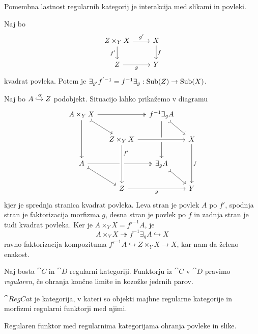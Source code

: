 \documentclass[../kategoricna_logika.tex]{subfiles}
\begin{document}
Pomembna lastnost regularnih kategorij je interakcija med
slikami in povleki.
\begin{lema}\label{lema:zamenjava-povleka-in-slike}
  Naj bo
  \begin{equation*}
    \begin{tikzcd}
      Z \times_Y X \ar[d, "f'"'] \ar[r, "g'"] & X \ar[d, "f"] \\
      Z \ar[r, "g"'] & Y
    \end{tikzcd}
  \end{equation*}
  kvadrat povleka. Potem je $\exists_{g'}f^{'-1} = f^{-1}\exists_g : \operatorname{Sub}(Z) \to \operatorname{Sub}(X)$.
\end{lema}
\begin{dokaz}
  Naj bo $A \xhookrightarrow{\alpha} Z$ podobjekt.  Situacijo lahko
  prikažemo v diagramu
  \begin{equation*}
    \begin{tikzcd}[column sep=small]
      A \times_Y X \ar[dd] \ar[dr, tail] \ar[rr, two heads] & &
      f^{-1}\exists_g A \ar[dd] \ar[dr, tail] & \\
      & Z \times_Y X  \ar[rr, crossing over] & & X \ar[dd, "f"] \\
      A \ar[dr, tail] \ar[rr, two heads] & & \exists_g A \ar[dr, tail] & \\
      & Z \ar[rr, "g"'] \ar[from=uu, pos=0.2, crossing over, "f'"] & &
      Y
    \end{tikzcd}
  \end{equation*}
  kjer je sprednja stranica kvadrat povleka.  Leva stran je povlek $A$
  po $f'$, spodnja stran je faktorizacija morfizma $g$, desna stran je
  povlek po $f$ in zadnja stran je tudi kvadrat povleka.  Ker je
  $A \times_Y X = f'^{-1}A$, je
  \[A \times_Y X \twoheadrightarrow f^{-1}\exists_g A \hookrightarrow
    X\] ravno faktorizacija kompozituma
  $f'^{-1}A \hookrightarrow Z \times_Y X \to X$, kar nam da želeno
  enakost.
\end{dokaz}
\begin{definicija}
  Naj bosta $\cat{C}$ in $\cat{D}$ regularni kategoriji.  Funktorju
  iz $\cat{C}$ v $\cat{D}$ pravimo \emph{regularen}, če ohranja
  končne limite in kozožke jedrnih parov.
\end{definicija}
\begin{definicija}
  $\cat{RegCat}$ je kategorija, v kateri so objekti majhne regularne
  kategorije in morfizmi regularni funktorji med njimi.
\end{definicija}
\begin{lema}
  Regularen funktor med regularnima kategorijama ohranja povleke in
  slike.
\end{lema}
\end{document}
